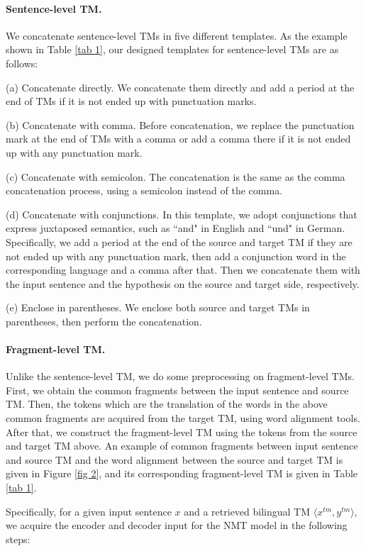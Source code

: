 \documentclass[letterpaper]{article} %
\begin{document}
\paragraph{Sentence-level TM.} We concatenate sentence-level TMs in five different templates. As the example shown in Table \ref{tab 1}, our designed templates for sentence-level TMs are as follows:

(a) Concatenate directly. We concatenate them directly and add a period at the end of TMs if it is not ended up with punctuation marks.

(b) Concatenate with comma. Before concatenation, we replace the punctuation mark at the end of TMs with a comma or add a comma there if it is not ended up with any punctuation mark.

(c) Concatenate with semicolon. The concatenation is the same as the comma concatenation process, using a semicolon instead of the comma.

(d) Concatenate with conjunctions. In this template, we adopt conjunctions that express juxtaposed semantics, such as ``and" in English and ``und" in German. Specifically, we add a period at the end of the source and target TM if they are not ended up with any punctuation mark, then add a conjunction word in the corresponding language and a comma after that. Then we concatenate them with the input sentence and the hypothesis on the source and target side, respectively.

(e) Enclose in parentheses. We enclose both source and target TMs in parentheses, then perform the concatenation.

\paragraph{Fragment-level TM.} Unlike the sentence-level TM, we do some preprocessing on fragment-level TMs. First, we obtain the common fragments between the input sentence and source TM. Then, the tokens which are the translation of the words in the above common fragments are acquired from the target TM, using word alignment tools. After that, we construct the fragment-level TM using the tokens from the source and target TM above. An example of common fragments between input sentence and source TM and the word alignment between the source and target TM is given in Figure \ref{fig 2}, and its corresponding fragment-level TM is given in Table \ref{tab 1}.

Specifically, for a given input sentence $x$ and a retrieved bilingual TM $\langle x^{tm},y^{tm}\rangle$, we acquire the encoder and decoder input for the NMT model in the following steps:
\end{document}
